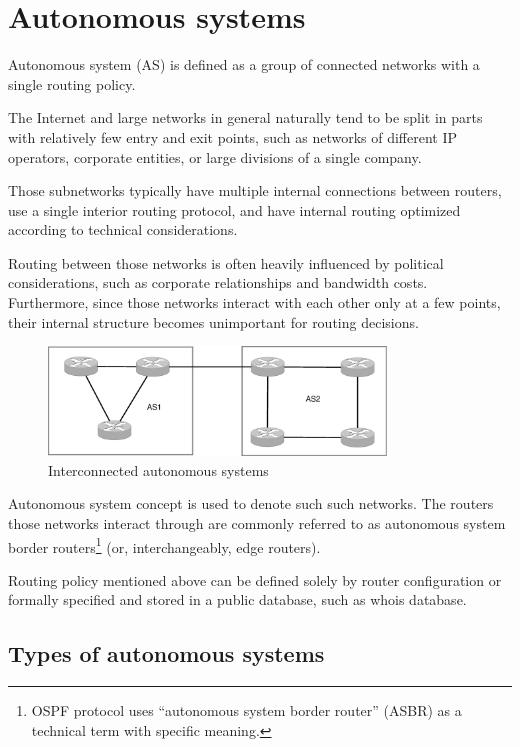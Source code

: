 \chapter{Autonomous systems}

Autonomous system (AS) is defined as a group of connected networks with a single routing policy\cite{rfc1930}.

The Internet and large networks in general naturally tend to be split in parts with relatively few
entry and exit points, such as networks of different IP operators, corporate entities, or large divisions
of a single company.

Those subnetworks typically have multiple internal connections between routers, use a single interior
routing protocol, and have internal routing optimized according to technical considerations.

Routing between those networks is often heavily influenced by political considerations, such as
corporate relationships and bandwidth costs. Furthermore, since those networks interact with each other
only at a few points, their internal structure becomes unimportant for routing decisions.

\begin{figure}[h]
    \centering
    \includegraphics[width=0.8\textwidth]{graphics/as_example.eps}
    \caption{Interconnected autonomous systems}
    \label{fig:as_example}
\end{figure}

Autonomous system concept is used to denote such such networks. The routers those networks interact
through are commonly referred to as autonomous system border routers\footnote{OSPF protocol uses
``autonomous system border router'' (ASBR) as a technical term with specific meaning.} (or, interchangeably, edge routers).

Routing policy mentioned above can be defined solely by router configuration or formally specified and stored in 
a public database, such as whois database.

\section{Types of autonomous systems}

